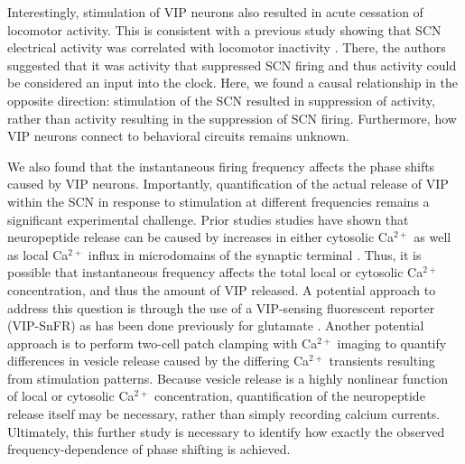 Interestingly, stimulation of VIP neurons also resulted in acute cessation of locomotor activity.
This is consistent with a previous study showing that SCN electrical activity was correlated with locomotor inactivity \cite{Vanoosterhout2012}.
There, the authors suggested that it was activity that suppressed SCN firing and thus activity could be considered an input into the clock.
Here, we found a causal relationship in the opposite direction: stimulation of the SCN resulted in suppression of activity, rather than activity resulting in the suppression of SCN firing.
Furthermore, how VIP neurons connect to behavioral circuits remains unknown.

We also found that the instantaneous firing frequency affects the phase shifts caused by VIP neurons.
Importantly, quantification of the actual release of VIP within the SCN in response to stimulation at different frequencies remains a significant experimental challenge.
Prior studies studies have shown that neuropeptide release can be caused by increases in either cytosolic  Ca$^{2+}$ as well as local Ca$^{2+}$ influx in microdomains of the synaptic terminal \cite{Verhage1991}.
Thus, it is possible that instantaneous frequency affects the total local or cytosolic Ca$^{2+}$ concentration, and thus the amount of VIP released.
A potential approach to address this question is through the use of a VIP-sensing fluorescent reporter (VIP-SnFR) as has been done previously for glutamate \cite{Marvin2013}.
Another potential approach is to perform two-cell patch clamping with Ca$^{2+}$ imaging to quantify differences in vesicle release caused by the differing Ca$^{2+}$ transients resulting from stimulation patterns.
Because vesicle release is a highly nonlinear function of local or cytosolic Ca$^{2+}$ concentration, quantification of the neuropeptide release itself may be necessary, rather than simply recording calcium currents.
Ultimately, this further study is necessary to identify how exactly the observed frequency-dependence of phase shifting is achieved.

